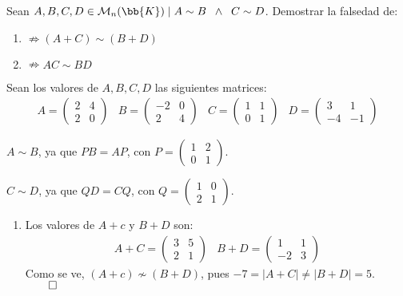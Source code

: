 \begin{ejercicio*}
    Sean $A,B,C,D \in \mathcal{M}_n(\bb{K}) \mid A \sim B \;\;\land\;\; C \sim D$. Demostrar la falsedad de:
    \begin{enumerate}
        \item $\nRightarrow (A+C) \sim (B+D)$
        \item $\nRightarrow AC \sim BD$
    \end{enumerate}
    
    Sean los valores de $A,B,C,D$ las siguientes matrices:
    \begin{equation*}\begin{array}{cccc}
        A = \left(\begin{array}{cc}
            2 & 4 \\
            2 & 0
        \end{array} \right) &
        B = \left(\begin{array}{cc}
            -2 & 0 \\
            2 & 4
        \end{array} \right) &
        C = \left(\begin{array}{cc}
            1 & 1 \\
            0 & 1
        \end{array} \right) &
        D = \left(\begin{array}{cc}
            3 & 1 \\
            -4 & -1
        \end{array} \right)
    \end{array}\end{equation*}
        
        $A\sim B$, ya que $PB=AP$, con $P = \left(\begin{array}{cc}
            1 & 2 \\
            0 & 1
        \end{array} \right)$.
        
        $C\sim D$, ya que $QD=CQ$, con $Q = \left(\begin{array}{cc}
            1 & 0 \\
            2 & 1
        \end{array} \right)$.

        
    \begin{enumerate}
        \item Los valores de $A+c$ y $B+D$ son:
        \begin{equation*}\begin{array}{cc}
            A+C = \left(\begin{array}{cc}
                3 & 5 \\
                2 & 1
            \end{array} \right) &
            B+D = \left(\begin{array}{cc}
                1 & 1 \\
                -2 & 3
            \end{array} \right)
        \end{array}\end{equation*}
        Como se ve, $(A+c)\nsim (B+D)$, pues $-7=|A+C| \neq |B+D|=5$. $\hfill \qed$


\end{enumerate}
\end{ejercicio*}
